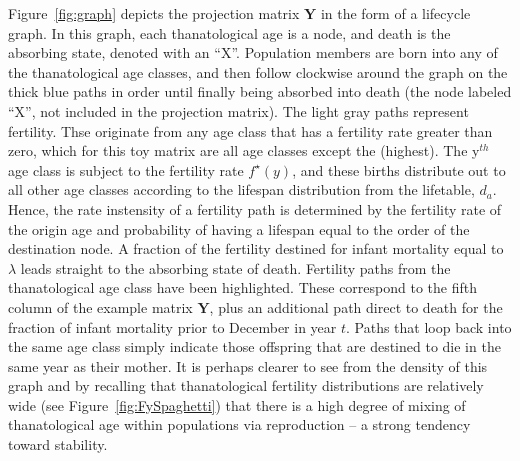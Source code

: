 \documentclass{article}
\begin{document}
Figure~\ref{fig:graph} depicts the projection matrix $\textbf{Y}$ in the form of
a lifecycle graph.  In this graph, each thanatological age is a node, and death
is the absorbing state, denoted with an ``X''.
Population members are born into any of the thanatological age classes, and then follow
clockwise around the graph on the thick blue paths in order until finally being
absorbed into death (the node labeled ``X'', not included in the projection matrix). The light gray paths represent fertility. Thse originate from any age class that has a fertility rate greater
than zero, which for this toy matrix are all age classes except the 
(highest). The y$^{th}$ age class is subject to the fertility rate $f^\star
(y)$, and these births distribute out to all other age classes according to the
lifespan distribution from the lifetable, $d_a$. Hence, the rate instensity of a
fertility path is determined by the fertility rate of the origin age and
probability of having a lifespan equal to the order of the destination node.  A fraction of
the fertility destined for infant mortality equal to $\lambda$ leads straight to the absorbing state of death. Fertility paths from the  thanatological age class have been highlighted. These correspond to the fifth column of the example matrix $\textbf{Y}$, plus an additional path
direct to death for the fraction of infant mortality prior to December 
in year $t$. Paths that loop back into the same age class simply indicate those
offspring that are destined to die in the same year as their mother. It is
perhaps clearer to see from the density of this graph and by recalling that
thanatological fertility distributions are relatively wide (see
Figure~\ref{fig:FySpaghetti}) that there is a high degree of mixing of
thanatological age within populations via reproduction -- a strong tendency
toward stability.
\end{document}
